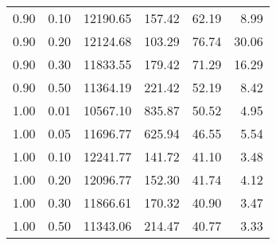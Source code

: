 \begin{table}
\begin{tabular}{rrrrrr}
0.90 & 0.10 & 12190.65 & 157.42 & 62.19 & 8.99 \\
0.90 & 0.20 & 12124.68 & 103.29 & 76.74 & 30.06 \\
0.90 & 0.30 & 11833.55 & 179.42 & 71.29 & 16.29 \\
0.90 & 0.50 & 11364.19 & 221.42 & 52.19 & 8.42 \\
1.00 & 0.01 & 10567.10 & 835.87 & 50.52 & 4.95 \\
1.00 & 0.05 & 11696.77 & 625.94 & 46.55 & 5.54 \\
1.00 & 0.10 & 12241.77 & 141.72 & 41.10 & 3.48 \\
1.00 & 0.20 & 12096.77 & 152.30 & 41.74 & 4.12 \\
1.00 & 0.30 & 11866.61 & 170.32 & 40.90 & 3.47 \\
1.00 & 0.50 & 11343.06 & 214.47 & 40.77 & 3.33 \\
\bottomrule
\end{tabular}
\end{table}
